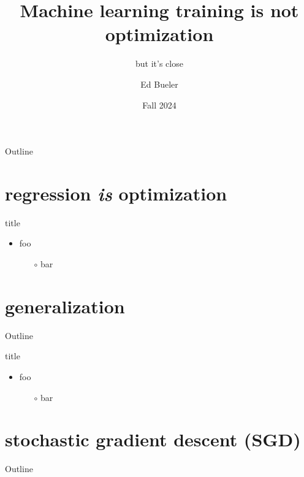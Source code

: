 \documentclass[10pt,
               svgnames,
               hyperref={colorlinks,citecolor=DeepPink4,linkcolor=FireBrick,urlcolor=Maroon},
               usepdftitle=false]{beamer}
\title{Machine learning training is not optimization}
\subtitle{but it's close}
\author{Ed Bueler}
\institute[]{UAF Math 661 Optimization}
\date{Fall 2024}
\begin{document}
\beamertemplatenavigationsymbolsempty

\begin{frame}
  \maketitle
\end{frame}

\begin{frame}{Outline}
  \tableofcontents[hideallsubsections]
\end{frame}


\section{regression \emph{is} optimization}

\begin{frame}{title}

\begin{itemize}
\item foo
   \begin{itemize}
   \item[$\circ$] bar
   \end{itemize}
\end{itemize}
\end{frame}


\section{generalization}

\begin{frame}{Outline}
\end{frame}

\begin{frame}{title}

\begin{itemize}
\item foo
   \begin{itemize}
   \item[$\circ$] bar
   \end{itemize}
\end{itemize}
\end{frame}


\section{stochastic gradient descent (SGD)}

\begin{frame}{Outline}
\end{frame}
\end{document}
